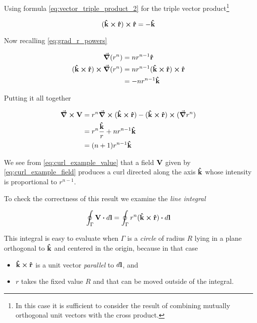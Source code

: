 Using formula \ref{eq:vector_triple_product_2} for the triple vector product\footnote{In this case it is sufficient to consider the result of combining mutually orthogonal unit vectors with the cross product.} 

\begin{equation*}
(\vu{k} \cross \vu{r}) \cross \vu{r} = -\vu{k} 
\end{equation*}

Now recalling \ref{eq:grad_r_powers}  

\begin{equation*}
\begin{aligned}
\grad (r^n) &= n r^{n-1} \vu{r} \\
(\vu{k} \cross \vu{r}) \cross \grad (r^n) &= n r^{n-1} (\vu{k} \cross \vu{r}) \cross \vu{r} \\
                                          &= - n r^{n-1} \vu{k} 
\end{aligned} 
\end{equation*}

Putting it all together 

\begin{equation}
\begin{aligned}
\curl{\vb{V}} &= r^n \curl{(\vu{k} \cross \vu{r})} - (\vu{k} \cross \vu{r}) \cross (\grad{r^n}) \\
              &= r^n \frac{\vu{k}}{r} + n r^{n-1} \vu{k}\\
              &= (n+1) r^{n-1} \vu{k} 
\end{aligned}
\label{eq:curl_example_value}
\end{equation}

We see from \ref{eq:curl_example_value} that a field $\vb{V}$ given by \ref{eq:curl_example_field} produces a curl directed along the axis $\vu{k}$ whose intensity is proportional to $r^{n-1}$. 

To check the correctness of this result we examine the \textit{line integral}

\begin{equation*}
\oint_{\Gamma} \vb{V} \vdot d\vb{l} = \oint_{\Gamma} r^n (\vu{k} \cross \vu{r}) \vdot d\vb{l}  
\end{equation*}
  
This integral is easy to evaluate when $\Gamma$ is a \textit{circle} of radius $R$ lying in a plane orthogonal to $\vu{k}$ and centered in the origin, because in that case 
\begin{itemize}
\item $\vu{k} \cross \vu{r}$ is a unit vector \textit{parallel} to $d\vb{l}$, and
\item $r$ takes the fixed value $R$ and that can be moved outside of the integral.
\end{itemize}

